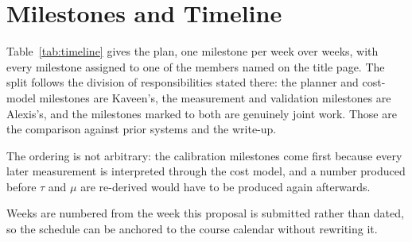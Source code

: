 \section{Milestones and Timeline}
\label{sec:milestones}

Table~\ref{tab:timeline} gives the plan, one milestone per week over
\timelineWeeks{} weeks, with every milestone assigned to one of the
\timelineMembers{} members named on the title page. The split follows the
division of responsibilities stated there: the planner and cost-model
milestones are Kaveen's, the measurement and validation milestones are
Alexis's, and the milestones marked to both are genuinely joint work. Those
are the comparison against prior systems and the write-up.

The ordering is not arbitrary: the calibration milestones come first because
every later measurement is interpreted through the cost model, and a number
produced before $\tau$ and $\mu$ are re-derived would have to be produced
again afterwards.

Weeks are numbered from the week this proposal is submitted rather than dated,
so the schedule can be anchored to the course calendar without rewriting it.



